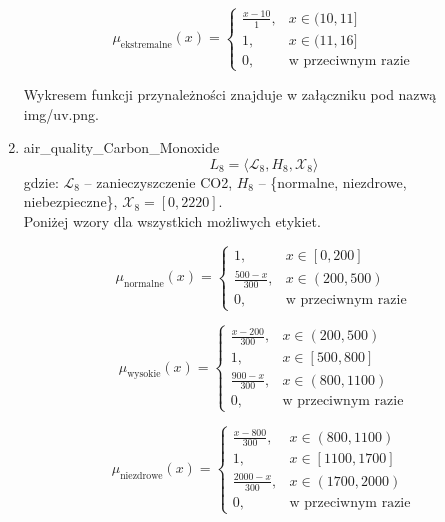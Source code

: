 \documentclass{article}
\begin{document}
\begin{enumerate}
    \begin{equation}
    \mu_{\text{ekstremalne}}(x) =
    \begin{cases}
    \frac{x - 10}{1}, & x \in (10, 11] \\
    1, & x \in (11, 16] \\
    0, & \text{w przeciwnym razie}
    \end{cases}
    \end{equation}

Wykresem funkcji przynależności znajduje w załączniku pod nazwą img/uv.png.

    \item air\_quality\_Carbon\_Monoxide
            \begin{equation}
            L_8 = \langle \mathcal{L}_8, H_8, \mathcal{X}_8 \rangle
        \end{equation}
        gdzie: $\mathcal{L}_8$ – zanieczyszczenie CO2, $H_8$ – \{normalne, niezdrowe, niebezpieczne\}, $\mathcal{X}_8 = [0, 2220]$. \\
        Poniżej wzory dla wszystkich możliwych etykiet.

    \begin{equation}
    \mu_{\text{normalne}}(x) =
    \begin{cases}
    1, & x \in [0, 200] \\
    \frac{500 - x}{300}, & x \in (200, 500) \\
    0, & \text{w przeciwnym razie}
    \end{cases}
    \end{equation}

    \begin{equation}
    \mu_{\text{wysokie}}(x) =
    \begin{cases}
    \frac{x - 200}{300}, & x \in (200, 500) \\
    1, & x \in [500, 800] \\
    \frac{900 - x}{300}, & x \in (800, 1100) \\
    0, & \text{w przeciwnym razie}
    \end{cases}
    \end{equation}
    
    \begin{equation}
    \mu_{\text{niezdrowe}}(x) =
    \begin{cases}
    \frac{x - 800}{300}, & x \in (800, 1100) \\
    1, & x \in [1100, 1700] \\
    \frac{2000 - x}{300}, & x \in (1700, 2000) \\
    0, & \text{w przeciwnym razie}
    \end{cases}
    \end{equation}
    

\end{enumerate}
\end{document}

